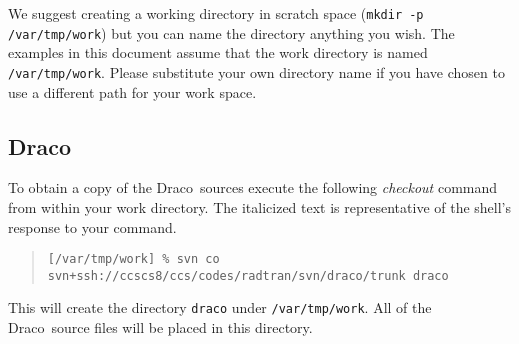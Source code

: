 \documentclass[11pt]{nmemo}
\newcommand{\comp}[1]{\normalfont\footnotesize\texttt{#1}\normalsize}
\newcommand{\draco}{{\normalfont\sffamily Draco}}
\newcommand{\svn}{{\normalfont\bfseries SVN}}
\begin{document}
We suggest creating a working directory in scratch space (\comp{mkdir
  -p /var/tmp/work}) but you can name the directory anything you wish.
The examples in this document assume that the work directory is named
\comp{/var/tmp/work}.  Please substitute your own directory name if
you have chosen to use a different path for your work space.

\subsection{\draco}

To obtain a copy of the \draco\ sources execute the following
\emph{checkout} command from within your work directory.  The
italicized text is representative of the shell's response to your
command.

\footnotesize
\begin{verse}
\texttt{[/var/tmp/work] \% svn co svn+ssh://ccscs8/ccs/codes/radtran/svn/draco/trunk draco} \\
\end{verse}
\normalsize

This will create the directory \comp{draco} under \comp{/var/tmp/work}.  All
of the \draco\ source files will be placed in this directory.  

%
\end{document}
